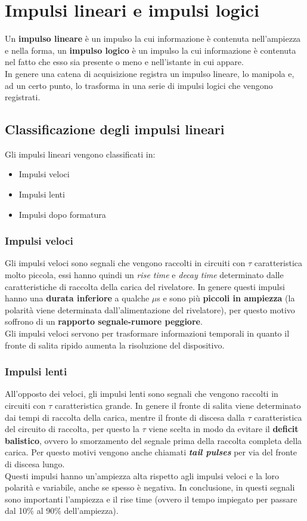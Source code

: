 \chapter{Impulsi lineari e impulsi logici}
Un \textbf{impulso lineare} \`e un impulso la cui informazione \`e contenuta nell'ampiezza e nella forma, un \textbf{impulso logico} \`e un impulso la cui informazione
\`e contenuta nel fatto che esso sia presente o meno e nell'istante in cui appare.\\
In genere una catena di acquisizione registra un impulso lineare, lo manipola e, ad un certo punto, lo trasforma in una serie di impulsi logici che vengono registrati.
\section{Classificazione degli impulsi lineari}
Gli impulsi lineari vengono classificati in:
\begin{itemize}
\item Impulsi veloci
\item Impulsi lenti
\item Impulsi dopo formatura
\end{itemize}
\subsection{Impulsi veloci}
Gli impulsi veloci sono segnali che vengono raccolti in circuiti con $\tau$ caratteristica molto piccola,
essi hanno quindi un \textit{rise time} e \textit{decay time} determinato dalle caratteristiche di raccolta della carica del rivelatore.
In genere questi impulsi hanno una \textbf{durata inferiore} a qualche $\mu$s e sono pi\`u \textbf{piccoli in ampiezza} (la polarit\`a viene determinata dall'alimentazione del rivelatore), per questo motivo soffrono di un \textbf{rapporto segnale-rumore peggiore}.\\
Gli impulsi veloci servono per trasformare informazioni temporali in quanto il fronte di salita ripido aumenta la risoluzione del dispositivo.
\subsection{Impulsi lenti}
All'opposto dei veloci, gli impulsi lenti sono segnali che vengono raccolti in circuiti con $\tau$ caratteristica grande. 
In genere il fronte di salita viene determinato dai tempi di raccolta della carica, mentre il fronte di discesa dalla $\tau$ caratteristica del circuito di raccolta,
per questo la $\tau$ viene scelta in modo da evitare il \textbf{deficit balistico}, ovvero lo smorzamento del segnale prima della raccolta completa della carica.
Per questo motivi vengono anche chiamati \textit{\textbf{tail pulses}} per via del fronte di discesa lungo.\\
Questi impulsi hanno un'ampiezza alta rispetto agli impulsi veloci e la loro polarit\`a e variabile, anche se spesso \`e negativa.
In conclusione, in questi segnali sono importanti l'ampiezza e il rise time (ovvero il tempo impiegato per passare dal 10\% al 90\% dell'ampiezza).
